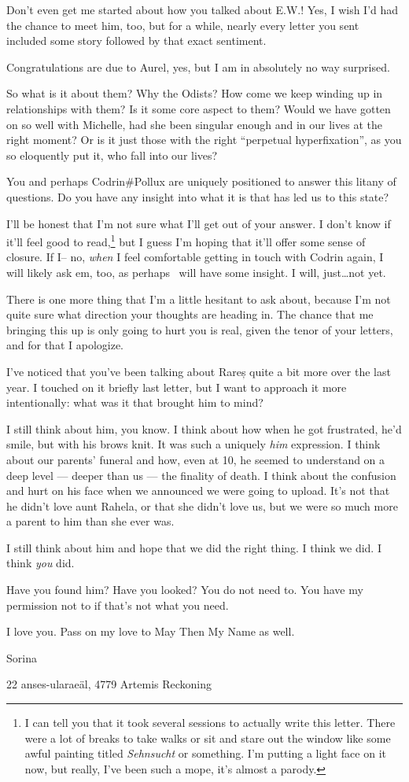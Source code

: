 Don't even get me started about how you talked about E.W.! Yes, I wish I'd had the chance to meet him, too, but for a while, nearly every letter you sent included some story followed by that exact sentiment.

Congratulations are due to Aurel, yes, but I am in absolutely no way surprised.

So what is it about them? Why the Odists? How come we keep winding up in relationships with them? Is it some core aspect to them? Would we have gotten on so well with Michelle, had she been singular enough and in our lives at the right moment? Or is it just those with the right ``perpetual hyperfixation'', as you so eloquently put it, who fall into our lives?

You and perhaps Codrin\#Pollux are uniquely positioned to answer this litany of questions. Do you have any insight into what it is that has led us to this state?

I'll be honest that I'm not sure what I'll get out of your answer. I don't know if it'll feel good to read,\footnote{I can tell you that it took several sessions to actually write this letter. There were a lot of breaks to take walks or sit and stare out the window like some awful painting titled \emph{Sehnsucht} or something. I'm putting a light face on it now, but really, I've been such a mope, it's almost a parody.} but I guess I'm hoping that it'll offer some sense of closure. If I-- no, \emph{when} I feel comfortable getting in touch with Codrin again, I will likely ask em, too, as perhaps \Partner\ will have some insight. I will, just\ldots not yet.

There is one more thing that I'm a little hesitant to ask about, because I'm not quite sure what direction your thoughts are heading in. The chance that me bringing this up is only going to hurt you is real, given the tenor of your letters, and for that I apologize.

I've noticed that you've been talking about Rareș quite a bit more over the last year. I touched on it briefly last letter, but I want to approach it more intentionally: what was it that brought him to mind?

I still think about him, you know. I think about how when he got frustrated, he'd smile, but with his brows knit. It was such a uniquely \emph{him} expression. I think about our parents' funeral and how, even at 10, he seemed to understand on a deep level — deeper than us — the finality of death. I think about the confusion and hurt on his face when we announced we were going to upload. It's not that he didn't love aunt Rahela, or that she didn't love us, but we were so much more a parent to him than she ever was.

I still think about him and hope that we did the right thing. I think we did. I think \emph{you} did.

Have you found him? Have you looked? You do not need to. You have my permission not to if that's not what you need.

I love you. Pass on my love to May Then My Name as well.

Sorina

22 anses-ularaeäl, 4779 Artemis Reckoning
